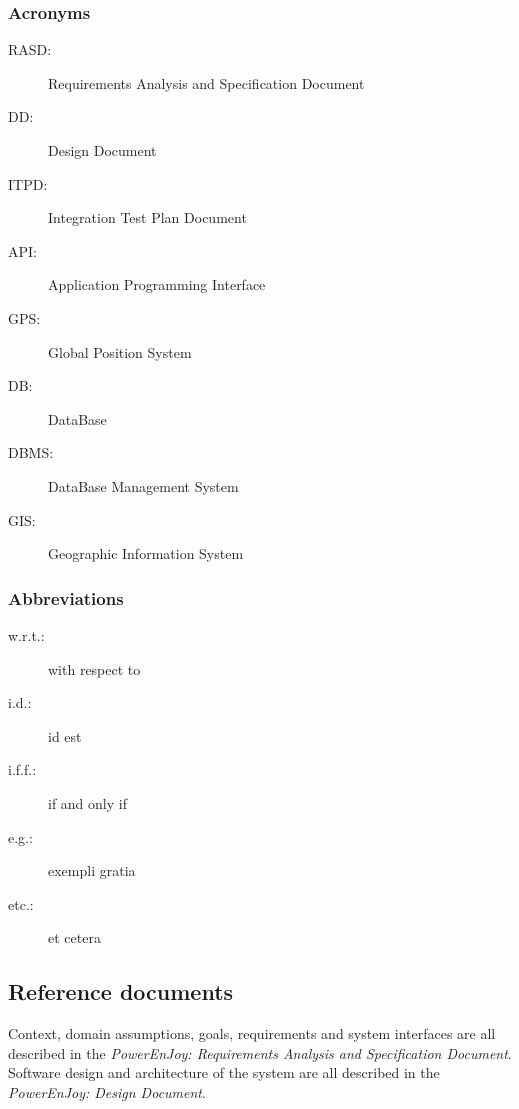 \subsubsection{Acronyms}
	\begin{description}
		\item [RASD:] Requirements Analysis and Specification Document
		\item [DD:] Design Document
		\item [ITPD:] Integration Test Plan Document
		\item [API:] Application Programming Interface
		\item [GPS:] Global Position System
		\item [DB:] DataBase
		\item [DBMS:] DataBase Management System
		\item [GIS:] Geographic Information System
	\end{description}
\subsubsection{Abbreviations}
	\begin{description}
		\item [w.r.t.:] with respect to
		\item [i.d.:] id est
		\item [i.f.f.:] if and only if
		\item [e.g.:] exempli gratia
		\item [etc.:] et cetera
	\end{description}

\subsection{Reference documents}
Context, domain assumptions, goals, requirements and system interfaces are all described in the \emph{PowerEnJoy: Requirements Analysis and Specification Document}\cite{RASD}.\\
Software design and architecture of the system are all described in the \emph{PowerEnJoy: Design Document}\cite{DD}.\\

